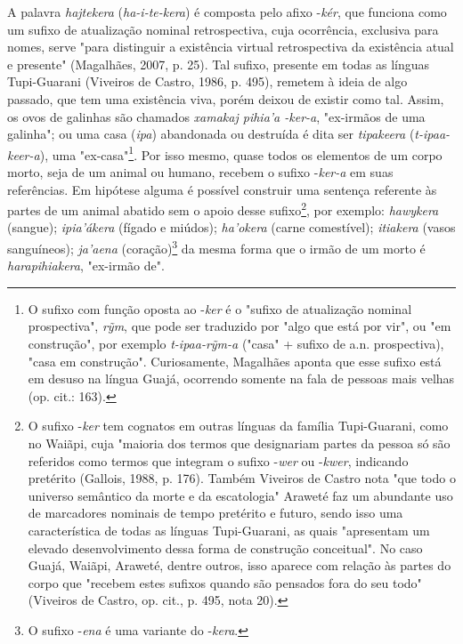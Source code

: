 A palavra \emph{hajtekera} (\emph{ha-i-te-kera}) é composta pelo afixo
-\emph{kér}, que funciona como um sufixo de atualização nominal
retrospectiva, cuja ocorrência, exclusiva para nomes, serve "para
distinguir a existência virtual retrospectiva da existência atual e
presente" (Magalhães, 2007, p. 25). Tal sufixo, presente em todas as
línguas Tupi-Guarani (Viveiros de Castro, 1986, p. 495), remetem à ideia
de algo passado, que tem uma existência viva, porém deixou de existir
como tal. Assim, os ovos de galinhas são chamados \emph{xamakaj pihia'a
-ker-a}, "ex-irmãos de uma galinha"; ou uma casa (\emph{ipa}) abandonada
ou destruída é dita ser \emph{tipakeera} (\emph{t-ipaa-keer-a}), uma
"ex-casa"\footnote{O sufixo com função oposta ao -\emph{ker} é o "sufixo
  de atualização nominal prospectiva", \emph{rỹm}, que pode ser
  traduzido por "algo que está por vir", ou "em construção", por exemplo
  \emph{t-ipaa-rỹm-a} ("casa" + sufixo de a.n. prospectiva), "casa em
  construção". Curiosamente, Magalhães aponta que esse sufixo está em
  desuso na língua Guajá, ocorrendo somente na fala de pessoas mais
  velhas (op. cit.: 163).}. Por isso mesmo, quase todos os elementos de
um corpo morto, seja de um animal ou humano, recebem o sufixo
-\emph{ker-a} em suas referências. Em hipótese alguma é possível
construir uma sentença referente às partes de um animal abatido sem o
apoio desse sufixo\footnote{O sufixo -\emph{ker} tem cognatos em outras
  línguas da família Tupi-Guarani, como no Waiãpi, cuja "maioria dos
  termos que designariam partes da pessoa só são referidos como termos
  que integram o sufixo -\emph{wer} ou -\emph{kwer}, indicando pretérito
  (Gallois, 1988, p. 176). Também Viveiros de Castro nota "que todo o
  universo semântico da morte e da escatologia" Araweté faz um abundante
  uso de marcadores nominais de tempo pretérito e futuro, sendo isso uma
  característica de todas as línguas Tupi-Guarani, as quais "apresentam
  um elevado desenvolvimento dessa forma de construção conceitual". No
  caso Guajá, Waiãpi, Araweté, dentre outros, isso aparece com relação
  às partes do corpo que "recebem estes sufixos quando são pensados fora
  do seu todo" (Viveiros de Castro, op. cit., p. 495, nota 20).}, por
exemplo: \emph{hawykera} (sangue); \emph{ipia'ákera} (fígado e miúdos);
\emph{ha'okera} (carne comestível); \emph{itiakera} (vasos sanguíneos);
\emph{ja'aena} (coração)\footnote{O sufixo -\emph{ena} é uma variante do
  -\emph{kera}.} da mesma forma que o irmão de um morto é
\emph{harapihiakera}, "ex-irmão de".

